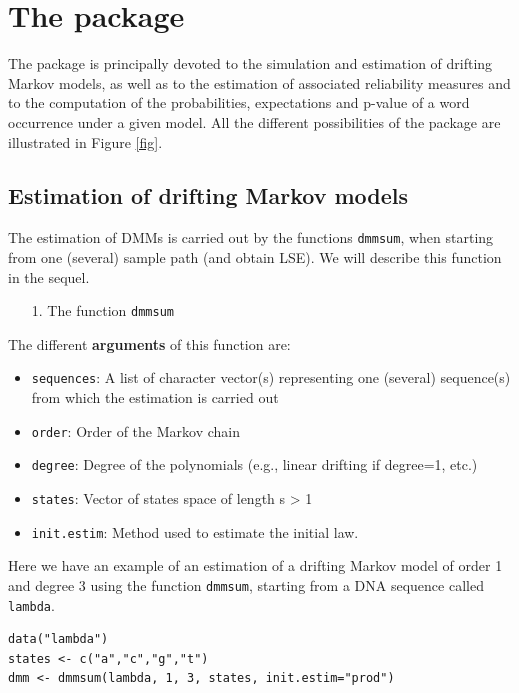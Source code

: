 \documentclass[article,nojss]{jss}\usepackage[]{graphicx}\usepackage[]{color}
\begin{document}
\section{The  package} \label{section_package}

The  package is principally devoted to the simulation and estimation of drifting Markov models, as well as to the estimation of associated  reliability measures and to the computation of the  probabilities, expectations and p-value of a word occurrence under a given model. All the different possibilities of the package are illustrated in Figure \ref{fig}.

\subsection{Estimation of drifting Markov models} \label{subsection_pack_estim}

The estimation of DMMs is carried out by the functions \verb|dmmsum|, when starting from one (several) sample path (and obtain LSE). We will describe this function in the sequel.

\begin{enumerate}
	\item[1.] The function \verb|dmmsum|
\end{enumerate}

The different {\bf arguments} of this function are:
%
\begin{itemize}
\item {\tt sequences}: A list of character vector(s) representing one (several) sequence(s) from which the estimation is carried out
\item {\tt order}:  Order of the Markov chain
\item {\tt degree}: Degree of the polynomials (e.g., linear drifting if degree=1, etc.)
\item {\tt states}: Vector of states space of length s > 1
\item {\tt init.estim}: Method used to estimate the initial law.

\end{itemize}

Here we have an example of an estimation of a drifting Markov model of order 1 and degree 3 using the function \verb|dmmsum|, starting from a DNA sequence called {\tt lambda}.

\begin{lstlisting}
data("lambda")
states <- c("a","c","g","t")
dmm <- dmmsum(lambda, 1, 3, states, init.estim="prod")
\end{lstlisting}
\end{document}
